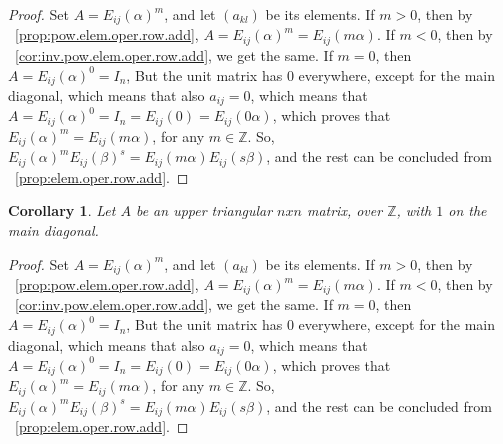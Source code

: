 \documentclass[12pt]{article}
\newtheorem{corollary}[theorem]{Corollary}
\begin{document}
\begin{proof}
Set $A=E_{ij}(\alpha)^m$, and let $(a_{kl})$ be its elements.
If $m>0$, then by ~\ref{prop:pow.elem.oper.row.add}, $A=E_{ij}(\alpha)^m=E_{ij}(m\alpha)$. If $m<0$, then by ~\ref{cor:inv.pow.elem.oper.row.add}, we get the same. If $m=0$, then $A=E_{ij}(\alpha)^0=I_n$, But the unit matrix has $0$ everywhere, except for the main diagonal, which means that also $a_{ij}=0$, which means that $A=E_{ij}(\alpha)^0=I_n=E_{ij}(0)=E_{ij}(0\alpha)$, which proves that $E_{ij}(\alpha)^m=E_{ij}(m\alpha)$, for any $m \in \mathbb{Z}$. So, $E_{ij}(\alpha)^m E_{ij}(\beta)^s=E_{ij}(m\alpha) E_{ij}(s\beta)$, and the rest can be concluded from ~\ref{prop:elem.oper.row.add}.
\end{proof}
\begin{corollary}
Let $A$ be an upper triangular $n x n$ matrix, over $\mathbb{Z}$, with $1$ on the main diagonal.
\end{corollary}
\begin{proof}
Set $A=E_{ij}(\alpha)^m$, and let $(a_{kl})$ be its elements.
If $m>0$, then by ~\ref{prop:pow.elem.oper.row.add}, $A=E_{ij}(\alpha)^m=E_{ij}(m\alpha)$. If $m<0$, then by ~\ref{cor:inv.pow.elem.oper.row.add}, we get the same. If $m=0$, then $A=E_{ij}(\alpha)^0=I_n$, But the unit matrix has $0$ everywhere, except for the main diagonal, which means that also $a_{ij}=0$, which means that $A=E_{ij}(\alpha)^0=I_n=E_{ij}(0)=E_{ij}(0\alpha)$, which proves that $E_{ij}(\alpha)^m=E_{ij}(m\alpha)$, for any $m \in \mathbb{Z}$. So, $E_{ij}(\alpha)^m E_{ij}(\beta)^s=E_{ij}(m\alpha) E_{ij}(s\beta)$, and the rest can be concluded from ~\ref{prop:elem.oper.row.add}.
\end{proof}
\end{document}
